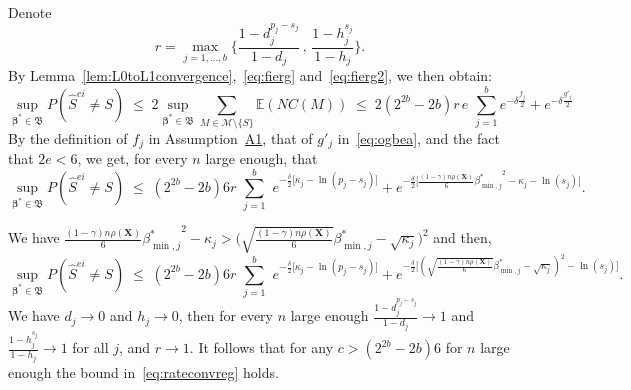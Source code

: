\documentclass[
  12pt]{article}
\newcommand{\E}{\mathbb{E}}
\newcommand{\M}{\mathcal{M}}
\newcommand{\bbeta}{\boldsymbol{\beta}}
\newcommand{\bX}{\mathbf{X}}
\newcommand{\bB}{\mathfrak{B}}
\begin{document}
Denote
\begin{equation} \label{eq:fierg2}r=\max_{j=1,\ldots,b}\bigg\{\frac{1-d_j^{p_j-s_j}}{1-d_j} \,,\,\frac{1-h_j^{s_j}}{1-h_j} \bigg\}.\end{equation} 
 By Lemma~\ref{lem:L0toL1convergence},~\eqref{eq:fierg} and~\eqref{eq:fierg2}, we then obtain:
$$\sup_{\bbeta^*\in \bB}P(\hat{S}^{ei} \neq S)\;\leq\;  2 \sup_{\bbeta^*\in \bB}\sum_{M \in \M\setminus \{S\}} \E\left(NC(M)\right)
     \;\leq\; 2 (2^{2b}-2b) r\,e\,\,\sum_{j=1}^b e^{-\delta \tfrac{f_j}{2}} +e^{-\delta \tfrac{g'_j}{2}}$$
By the definition of $f_j$ in Assumption~\hyperlink{lab:A1}{A1}, that of $g'_j$ in~\eqref{eq:ogbea}, and the fact that $2e<6$,  we get, for every $n$ large enough, that
\begin{equation}\label{eq:gpkr}
    \sup_{\bbeta^*\in \bB} P(\hat{S}^{ei} \neq S)\;\leq\; (2^{2b}-2b)6r\,\,\sum_{j=1}^b\,\, e^{-\tfrac{\delta}{2}\big[\kappa_j-\ln(p_j-s_j)\big]} + e^{-\tfrac{\delta}{2}\big[\frac{(1-\gamma) n\rho(\bX)}{6}{\beta_{\min,j}^*}^2 - \kappa_j -\ln(s_j) \big]}.
\end{equation}

We have $\frac{(1-\gamma) n\rho(\bX)}{6}{\beta_{\min,j}^*}^2 - \kappa_j > \Big(\sqrt{\frac{(1-\gamma) n\rho(\bX)}{6}}{\beta_{\min,j}^*} - \sqrt{\kappa_j}\Big)^2$ and then,
$$\sup_{\bbeta^*\in \bB} P(\hat{S}^{ei} \neq S)\;\leq\; (2^{2b}-2b)6r\,\,\sum_{j=1}^b\,\, e^{-\tfrac{\delta}{2}\big[\kappa_j-\ln(p_j-s_j)\big]} + e^{-\tfrac{\delta}{2}\big[(\sqrt{\frac{(1-\gamma) n\rho(\bX)}{6}}{\beta_{\min,j}^*} - \sqrt{\kappa_j})^2 -\ln(s_j) \big]}.
$$
We have $d_j \to 0$ and $h_j \to 0$, then for every $n$ large enough $\frac{1-d_j^{p_j-s_j}}{1-d_j}\to1$ and $\frac{1-h_j^{s_j}}{1-h_j}\to1$ for all $j$, and $r\to 1$. It follows that for any $c>(2^{2b}-2b)6$ for $n$ large enough the bound in~\eqref{eq:rateconvreg} holds. 
\end{document}
